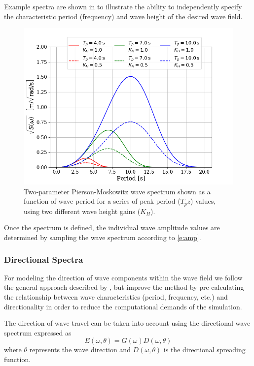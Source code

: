 \documentclass[utf8]{frontiersSCNS} %
\begin{document}
Example spectra are shown in  to illustrate the ability to independently specify the characteristic period (frequency) and wave height of the desired wave field.
\begin{figure}[hbt!]
  \centering
  \includegraphics[width=\SFc\textwidth]{src/pm_spectra_2.png}
  \caption{Two-parameter Pierson-Moskowitz wave spectrum shown as a function of wave period for a series of peak period ($T_pz$) values, using two different wave height gains ($K_H$).}
  \label{f:pm}
\end{figure} 
Once the spectrum is defined, the individual wave amplitude values are determined by sampling the wave spectrum according to \eqref{e:amp}.

\subsubsection{Directional Spectra}
For modeling the direction of wave components within the wave field we follow the general approach described by \citet{frechot06realistic}, but improve the method by pre-calculating the relationship between wave characteristics (period, frequency, etc.) and directionality in order to reduce the computational demands of the simulation.

The direction of wave travel can be taken into account using the directional wave spectrum expressed as
\begin{equation}
  E(\omega,\theta)=G(\omega)D(\omega,\theta)
\end{equation}
where $\theta$ represents the wave direction and $D(\omega,\theta)$ is the directional spreading function. %
\end{document}
